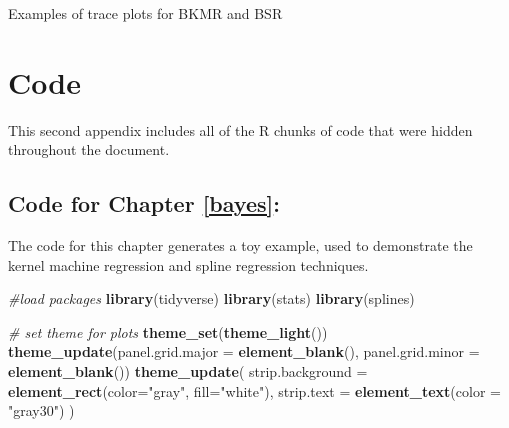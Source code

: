 \documentclass[12pt, twoside]{amherstthesis}
\newenvironment{Shaded}{\begin{snugshade}}{\end{snugshade}}
\newcommand{\AttributeTok}[1]{\textcolor[rgb]{0.13,0.29,0.53}{#1}}
\newcommand{\CommentTok}[1]{\textcolor[rgb]{0.56,0.35,0.01}{\textit{#1}}}
\newcommand{\FunctionTok}[1]{\textcolor[rgb]{0.13,0.29,0.53}{\textbf{#1}}}
\newcommand{\NormalTok}[1]{#1}
\newcommand{\StringTok}[1]{\textcolor[rgb]{0.31,0.60,0.02}{#1}}
\begin{document}
Examples of trace plots for BKMR and BSR

\hypertarget{code}{%
\chapter{Code}\label{code}}

This second appendix includes all of the R chunks of code that were hidden throughout the document.

\hypertarget{code-for-chapter-refbayes}{%
\section{Code for Chapter \ref{bayes}:}\label{code-for-chapter-refbayes}}

The code for this chapter generates a toy example, used to demonstrate the kernel machine regression and spline regression techniques.
\begin{Shaded}
\begin{Highlighting}[]
\CommentTok{\#load packages}
\FunctionTok{library}\NormalTok{(tidyverse)}
\FunctionTok{library}\NormalTok{(stats)}
\FunctionTok{library}\NormalTok{(splines)}
\end{Highlighting}
\end{Shaded}
\begin{Shaded}
\begin{Highlighting}[]
\CommentTok{\# set theme for plots}
\FunctionTok{theme\_set}\NormalTok{(}\FunctionTok{theme\_light}\NormalTok{())}
\FunctionTok{theme\_update}\NormalTok{(}\AttributeTok{panel.grid.major =} \FunctionTok{element\_blank}\NormalTok{(), }
             \AttributeTok{panel.grid.minor =} \FunctionTok{element\_blank}\NormalTok{())}
\FunctionTok{theme\_update}\NormalTok{(}
  \AttributeTok{strip.background =} \FunctionTok{element\_rect}\NormalTok{(}\AttributeTok{color=}\StringTok{"gray"}\NormalTok{, }\AttributeTok{fill=}\StringTok{"white"}\NormalTok{), }
  \AttributeTok{strip.text =} \FunctionTok{element\_text}\NormalTok{(}\AttributeTok{color =} \StringTok{"gray30"}\NormalTok{)}
\NormalTok{  )}
\end{Highlighting}
\end{Shaded}
\end{document}

